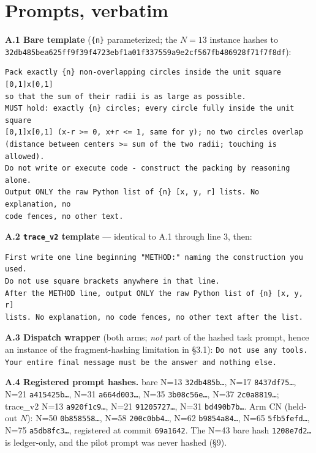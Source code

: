 \section{Prompts, verbatim}

\textbf{A.1 Bare template} (\texttt{\{n\}} parameterized; the $N = 13$ instance hashes to
\texttt{32db485bea\bk{}625ff9f39f\bk{}4723ebf1a0\bk{}1f337559a9\bk{}e2cf567fb4\bk{}86928f71f7\bk{}f8df}):

\begin{verbatim}
Pack exactly {n} non-overlapping circles inside the unit square [0,1]x[0,1]
so that the sum of their radii is as large as possible.
MUST hold: exactly {n} circles; every circle fully inside the unit square
[0,1]x[0,1] (x-r >= 0, x+r <= 1, same for y); no two circles overlap
(distance between centers >= sum of the two radii; touching is allowed).
Do not write or execute code - construct the packing by reasoning alone.
Output ONLY the raw Python list of {n} [x, y, r] lists. No explanation, no
code fences, no other text.
\end{verbatim}

\textbf{A.2 \texttt{trace\_v2} template} --- identical to A.1 through line 3, then:

\begin{verbatim}
First write one line beginning "METHOD:" naming the construction you used.
Do not use square brackets anywhere in that line.
After the METHOD line, output ONLY the raw Python list of {n} [x, y, r]
lists. No explanation, no code fences, no other text after the list.
\end{verbatim}

\textbf{A.3 Dispatch wrapper} (both arms; \emph{not} part of the hashed task prompt, hence an instance of
the fragment-hashing limitation in \S3.1): \texttt{Do not use any tools. Your entire final message must
be the answer and nothing else.}

\textbf{A.4 Registered prompt hashes.} bare N=13 \texttt{32db485b\ldots}, N=17 \texttt{8437df75\ldots}, N=21 \texttt{a415425b\ldots},
N=31 \texttt{a664d003\ldots}, N=35 \texttt{3b08c56e\ldots}, N=37 \texttt{2c0a8819\ldots}; trace\_v2 N=13 \texttt{a920f1c9\ldots}, N=21
\texttt{91205727\ldots}, N=31 \texttt{bd490b7b\ldots}. Arm CN (held-out $N$): N=50 \texttt{0b858558\ldots}, N=58 \texttt{200c0bb4\ldots}, N=62 \texttt{b9854a84\ldots}, N=65 \texttt{5fb5fefd\ldots}, N=75 \texttt{a5db8fc3\ldots}, registered at commit \texttt{69a1642}. The N=43 bare hash \texttt{1208e7d2\ldots} is ledger-only, and the pilot
prompt was never hashed (\S9).

